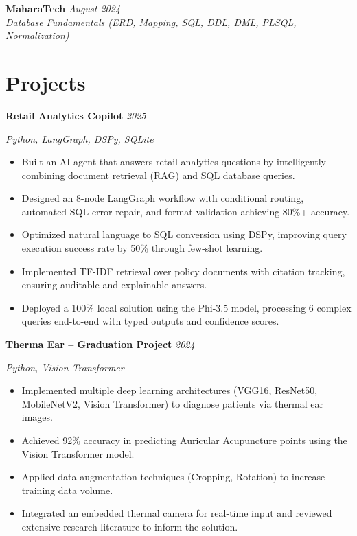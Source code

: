 \documentclass[a4paper,11pt]{article}
\newcommand{\cvcert}[3]{%
  \textbf{#1} \hfill \textit{#3} \\
  \textit{#2}
  \vspace{2pt}
}
\newcommand{\cvproject}[2]{%
  \textbf{#1} \hfill \textit{#2}
  \vspace{2pt}
}
\begin{document}
\vspace{4pt}

\cvcert{MaharaTech}{Database Fundamentals (ERD, Mapping, SQL, DDL, DML, PLSQL, Normalization)}{August 2024}

\section{Projects}

\cvproject{Retail Analytics Copilot}{2025}
\textit{Python, LangGraph, DSPy, SQLite}
\begin{itemize}[leftmargin=1.5em, topsep=2pt, itemsep=1pt]
  \item Built an AI agent that answers retail analytics questions by intelligently combining document retrieval (RAG) and SQL database queries.
  \item Designed an 8-node LangGraph workflow with conditional routing, automated SQL error repair, and format validation achieving 80\%+ accuracy.
  \item Optimized natural language to SQL conversion using DSPy, improving query execution success rate by 50\% through few-shot learning.
  \item Implemented TF-IDF retrieval over policy documents with citation tracking, ensuring auditable and explainable answers.
  \item Deployed a 100\% local solution using the Phi-3.5 model, processing 6 complex queries end-to-end with typed outputs and confidence scores.
\end{itemize}

\vspace{6pt}

\cvproject{Therma Ear -- Graduation Project}{2024}
\textit{Python, Vision Transformer}
\begin{itemize}[leftmargin=1.5em, topsep=2pt, itemsep=1pt]
  \item Implemented multiple deep learning architectures (VGG16, ResNet50, MobileNetV2, Vision Transformer) to diagnose patients via thermal ear images.
  \item Achieved 92\% accuracy in predicting Auricular Acupuncture points using the Vision Transformer model.
  \item Applied data augmentation techniques (Cropping, Rotation) to increase training data volume.
  \item Integrated an embedded thermal camera for real-time input and reviewed extensive research literature to inform the solution.
\end{itemize}
\end{document}

